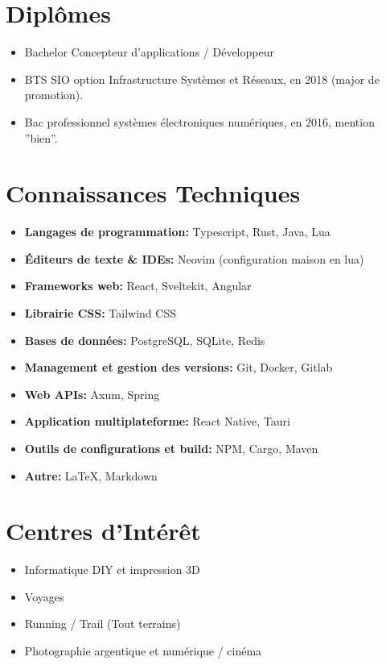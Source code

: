 \documentclass{article}
\begin{document}
\begin{multicols}{2}
\section*{Diplômes}
\begin{itemize}
    \item Bachelor Concepteur d’applications / Développeur
    \item BTS SIO option Infrastructure Systèmes et Réseaux, en 2018 (major de promotion).
    \item Bac professionnel systèmes électroniques numériques, en 2016, mention ”bien”.
\end{itemize}

\section*{Connaissances Techniques}
\begin{itemize}
    \item \textbf{Langages de programmation:} Typescript, Rust, Java, Lua
    \item \textbf{Éditeurs de texte \& IDEs:} Neovim (configuration maison en lua)
    \item \textbf{Frameworks web:} React, Sveltekit, Angular
    \item \textbf{Librairie CSS:} Tailwind CSS
    \item \textbf{Bases de données:} PostgreSQL, SQLite, Redis
    \item \textbf{Management et gestion des versions:} Git, Docker, Gitlab
    \item \textbf{Web APIs:} Axum, Spring
    \item \textbf{Application multiplateforme:} React Native, Tauri
    \item \textbf{Outils de configurations et build:} NPM, Cargo, Maven
    \item \textbf{Autre:} LaTeX, Markdown
\end{itemize}

\section*{Centres d’Intérêt}
\begin{itemize}
    \item Informatique DIY et impression 3D
    \item Voyages
    \item Running / Trail (Tout terrains)
    \item Photographie argentique et numérique / cinéma
\end{itemize}

\end{multicols}
\end{document}
